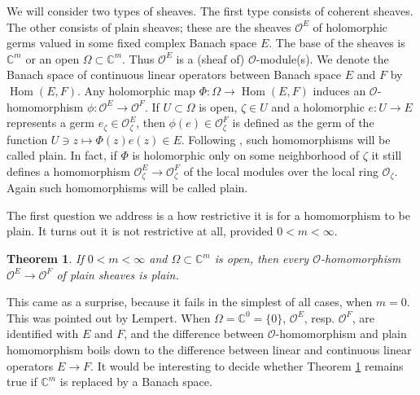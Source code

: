 \documentclass{amsart}
\numberwithin{equation}{section}
\theoremstyle{definition}
\theoremstyle{plain}
\newtheorem{theorem}[definition]{Theorem}
\theoremstyle{remark}
\begin{document}
We will consider two types of sheaves. The first type consists of 
coherent sheaves. The other consists of plain sheaves; these are
the sheaves ${\ensuremath{\mathcal{{O}}}}^E$ of holomorphic germs valued in some fixed
complex Banach space $E$. The base of the sheaves is 
$\mathbb{C}^m$ or an open $\Omega\subset\mathbb{C}^m$.
Thus ${\ensuremath{\mathcal{{O}}}}^E$ is a (sheaf of) {\ensuremath{\mathcal{{O}}}}-module(s).
We denote the Banach space of continuous linear operators between
Banach space $E$ and $F$ by ${{\mathop{\mathrm{Hom}}}}(E,F)$.
Any holomorphic map $\Phi:\Omega\rightarrow{{\mathop{\mathrm{Hom}}}}(E,F)$ induces
an {\ensuremath{\mathcal{{O}}}}-homomorphism $\phi:{\ensuremath{\mathcal{{O}}}}^E\rightarrow{\ensuremath{\mathcal{{O}}}}^F$.
If $U\subset\Omega$ is open, $\zeta\in U$ and a holomorphic 
$e:U\rightarrow E$ represents a germ $e_\zeta\in{\ensuremath{\mathcal{{O}}}}^E_\zeta$,
then $\phi(e)\in{\ensuremath{\mathcal{{O}}}}^{F}_\zeta$ is defined as the germ of the function
$U\ni z\mapsto \Phi(z)e(z)\in E$.
Following \cite{LP}, such homomorphisms will be called plain.
In fact, if $\Phi$ is holomorphic only on
some neighborhood of $\zeta$ it still defines a homomorphism 
${\ensuremath{\mathcal{{O}}}}^E_\zeta\rightarrow{\ensuremath{\mathcal{{O}}}}^F_\zeta$ of the local modules over
the local ring ${\ensuremath{\mathcal{{O}}}}_\zeta$. Again such homomorphisms will be called
plain.

The first question we address is a how restrictive it is for a homomorphism
to be plain. It turns out it is not restrictive at all, provided
$0<m<\infty$.
\begin{theorem}\label{thm_plain}
If $0<m<\infty$ and $\Omega\subset\mathbb{C}^m$ is open, then every ${\ensuremath{\mathcal{{O}}}}$-homomorphism ${\ensuremath{\mathcal{{O}}}}^E\rightarrow{\ensuremath{\mathcal{{O}}}}^F$ of plain sheaves is plain.
\end{theorem}

This came as a surprise, because it fails in the simplest of all cases, when
$m=0$. This was pointed out by Lempert.
When $\Omega=\mathbb{C}^0=\{0\}$, ${\ensuremath{\mathcal{{O}}}}^E$, resp. ${\ensuremath{\mathcal{{O}}}}^F$,
are identified with $E$ and $F$, and the difference between 
${\ensuremath{\mathcal{{O}}}}$-homomorphism and plain homomorphism boils down to the 
difference between linear and continuous linear operators $E\rightarrow F$.
It would be interesting to decide whether Theorem \ref{thm_plain} 
remains true if $\mathbb{C}^m$ is replaced by a Banach space.
\end{document}
